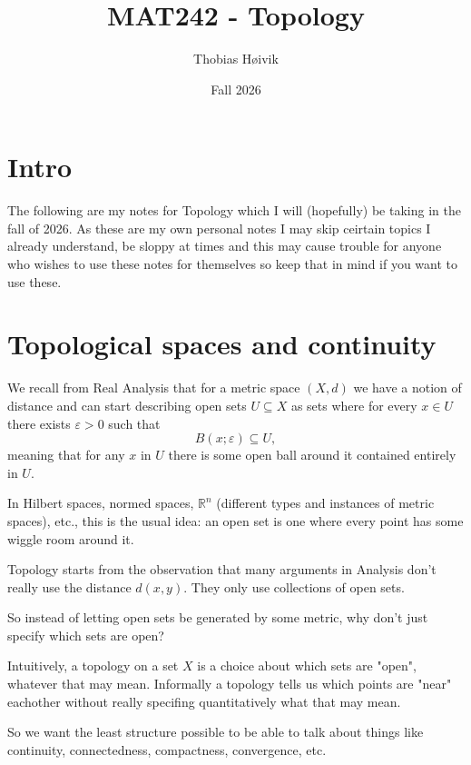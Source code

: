 \documentclass[11pt]{article}
\title{\huge{MAT242 - Topology}}
\author{\LARGE{Thobias Høivik}}
\date{Fall 2026}
\begin{document}
\maketitle

\tableofcontents

\newpage
\section*{Intro}
The following are my notes for Topology which I will 
(hopefully) be taking in the fall of 2026. 
As these are my own personal notes I may skip ceirtain 
topics I already understand, be sloppy at times and 
this may cause trouble for anyone who wishes 
to use these notes for themselves so keep that in 
mind if you want to use these. 

\section{Topological spaces and continuity}
We recall from Real Analysis that for a metric 
space $(X,d)$ we have a notion of distance 
and can start describing open sets 
$U \subseteq X$ as sets where for every $x \in U$ 
there exists $\varepsilon > 0$ such that 
\[
    B(x;\varepsilon) \subseteq U, 
\]
meaning that for any $x$ in $U$ there is 
some open ball around it contained entirely in $U$.

In Hilbert spaces, normed spaces, $\mathbb R^n$ (different 
types and instances of metric spaces), etc., this is the usual idea: 
an open set is one where every point has some wiggle room around it.

Topology starts from the observation that many arguments in 
Analysis don't really use the distance $d(x,y)$. They only 
use collections of open sets. 

So instead of letting open sets be generated by some metric, why 
don't just specify which sets are open? 

Intuitively, a topology on a set $X$ is a choice about which 
sets are "open", whatever that may mean. 
Informally a topology tells us which points are "near" eachother 
without really specifing quantitatively what that may mean. 

So we want the least structure possible to be able to talk 
about things like continuity, connectedness, compactness, 
convergence, etc. 
\end{document}

